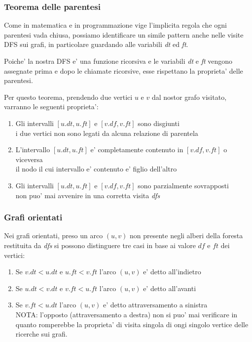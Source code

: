 \documentclass{article}
\begin{document}
\subsubsection{Teorema delle parentesi}

Come in matematica e in programmazione vige l'implicita regola che ogni parentesi
vada chiusa, possiamo identificare un simile pattern anche nelle visite DFS sui
grafi, in particolare guardando alle variabili \emph{dt} ed \emph{ft}.

Poiche' la nostra DFS e' una funzione ricorsiva e le variabili \emph{dt} e \emph{ft}
vengono assegnate prima e dopo le chiamate ricorsive, esse rispettano la proprieta'
delle parentesi.

Per questo teorema, prendendo due vertici $u$ e $v$ dal nostor grafo visitato,
varranno le seguenti proprieta':

\begin{enumerate}
  \item Gli intervalli $[u.dt, u.ft]$ e $[v.df, v.ft]$ sono disgiunti \\
    i due vertici non sono legati da alcuna relazione di parentela
  \item L'intervallo $[u.dt, u.ft]$ e' completamente contenuto in  $[v.df, v.ft]$ o viceversa \\
    il nodo il cui intervallo e' contenuto e' figlio dell'altro
  \item Gli intervalli $[u.dt, u.ft]$ e $[v.df, v.ft]$ sono parzialmente sovrapposti \\
    non puo' mai avvenire in una corretta visita \emph{dfs}
\end{enumerate}

\subsubsection{Grafi orientati}

Nei grafi orientati, preso un arco $(u, v)$ non presente negli alberi della foresta
restituita da \emph{dfs} si possono distinguere tre casi in base ai valore $df$ e $ft$
dei vertici:

\begin{enumerate}
  \item Se $v.dt < u.dt$ e $u.ft < v.ft$ l'arco $(u, v)$ e' detto all'indietro
  \item Se $u.dt < v.dt$ e $v.ft < u.ft$ l'arco $(u, v)$ e' detto all'avanti
  \item Se $v.ft < u.dt$ l'arco $(u, v)$ e' detto attraversamento a sinistra \\
    NOTA: l'opposto (attraversamento a destra) non si puo' mai verificare in
    quanto romperebbe la proprieta' di visita singola di ongi singolo vertice
    delle ricerche sui grafi.
\end{enumerate}
\end{document}
